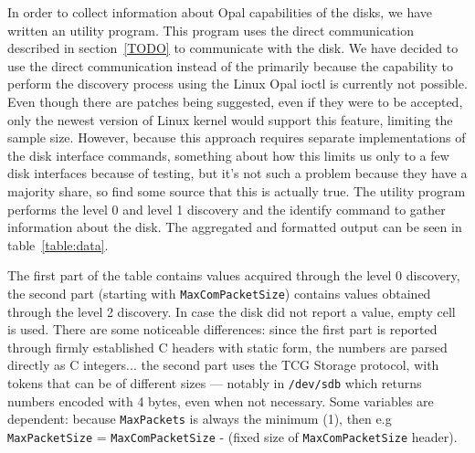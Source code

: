 \documentclass[
  digital, %
  oneside, %
  nolof,     %
  nolot,     %
]{fithesis4}
\begin{document}
In order to collect information about Opal capabilities of the disks, we have written an utility program. This program uses the direct communication described in section~\ref{TODO} to communicate with the disk. We have decided to use the direct communication instead of the primarily because the capability to perform the discovery process using the Linux Opal ioctl is currently not possible. Even though there are patches being suggested, even if they were to be accepted, only the newest version of Linux kernel would support this feature, limiting the sample size.
However, because this approach requires separate implementations of the disk interface commands, something about how this limits us only to a few disk interfaces because of testing, but it's not such a problem because they have a majority share, so find some source that this is actually true.
The utility program performs the level 0 and level 1 discovery and the identify command to gather information about the disk.
The aggregated and formatted output can be seen in table~\ref{table:data}.

The first part of the table contains values acquired through the level 0 discovery, the second part (starting with \verb|MaxComPacketSize|) contains values obtained through the level 2 discovery. In case the disk did not report a value, empty cell is used.
There are some noticeable differences: since the first part is reported through firmly established C headers with static form, the numbers are parsed directly as C integers... the second part uses the TCG Storage protocol, with tokens that can be of different sizes --- notably in \verb|/dev/sdb| which returns numbers encoded with 4 bytes, even when not necessary.
Some variables are dependent: because \verb|MaxPackets| is always the minimum (1), then e.g \verb|MaxPacketSize| = \verb|MaxComPacketSize| - (fixed size of \verb|MaxComPacketSize| header).


\newpage

\printbibliography[heading=bibintoc] %
\end{document}
